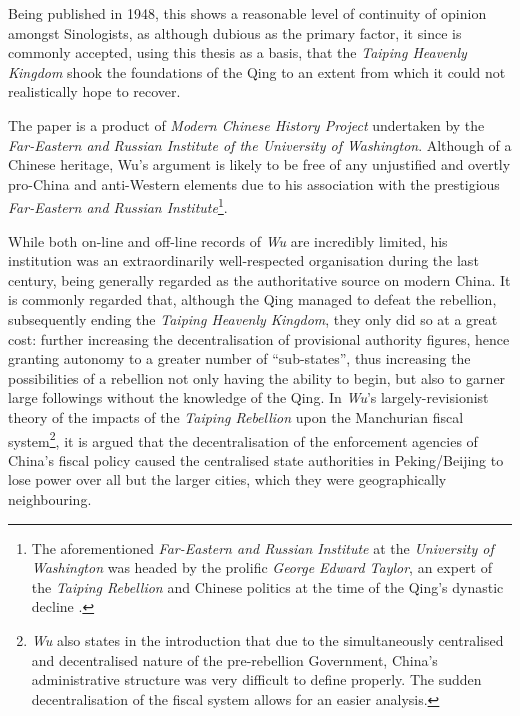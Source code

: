 \documentclass[a4paper,oneside]{article}
\begin{document}
Being published in 1948, this shows a reasonable level of continuity of opinion
amongst Sinologists, as although dubious as the primary factor, it since is
commonly accepted, using this thesis as a basis, that the \textit{Taiping
Heavenly Kingdom} shook the foundations of the Qing to an extent from which it
could not realistically hope to recover.


The paper is a product of \textit{Modern Chinese History Project} undertaken by
the \textit{Far-Eastern and Russian Institute of the University of Washington}.
Although of a Chinese heritage, Wu's argument is likely to be free of any
unjustified and overtly pro-China and anti-Western elements due to his
association with the prestigious \textit{Far-Eastern and Russian
Institute}\footnote{The aforementioned \textit{Far-Eastern and Russian
Institute} at the \textit{University of Washington} was headed by the prolific
\textit{George Edward Taylor}, an expert of the \textit{Taiping Rebellion} and
Chinese politics at the time of the Qing's dynastic decline
\autocite{Taylor:1999}.}.

While both on-line and off-line records of \textit{Wu} are incredibly limited,
his institution was an extraordinarily well-respected organisation during the
last century, being generally regarded as the authoritative source on modern
China. It is commonly regarded that, although the Qing managed to defeat the
rebellion, subsequently ending the \textit{Taiping Heavenly Kingdom}, they only
did so at a great cost: further increasing the decentralisation of provisional
authority figures, hence granting autonomy to a greater number of
``sub-states'', thus increasing the possibilities of a rebellion not only having
the ability to begin, but also to garner large followings without the knowledge
of the Qing. In \textit{Wu}'s largely-revisionist theory of the impacts of the
\textit{Taiping Rebellion} upon the Manchurian fiscal
system\footnote{\textit{Wu} also states in the introduction that due to the
simultaneously centralised and decentralised nature of the pre-rebellion
Government, China's administrative structure was very difficult to define
properly. The sudden decentralisation of the fiscal system allows for an easier
analysis.}, it is argued that the decentralisation of the enforcement agencies
of China's fiscal policy caused the centralised state authorities in
Peking/Beijing to lose power over all but the larger cities, which they were
geographically neighbouring.
\end{document}
